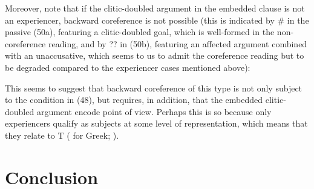 \documentclass[output=paper]{langsci/langscibook}
\begin{document}
    \z

Moreover, note that if the clitic-doubled argument in the embedded clause is not an experiencer, backward coreference is not possible (this is indicated by \# in the passive (50a), featuring a clitic-doubled goal, which is well-formed in the non-coreference reading, and by ?? in (50b), featuring an affected argument combined with an unaccusative, which seems to us to admit the coreference reading but to be degraded compared to the experiencer cases mentioned above):

\ea%
    \label{ex:alexiadou:57}
    \z
\z    

This seems to suggest that backward coreference of this type is not only subject to the condition in (48), but requires, in addition, that the embedded clitic-doubled argument encode point of view. Perhaps this is so because only experiencers qualify as subjects at some level of representation, which means that they relate to T (\citealt{Anagnostopoulou1999} for Greek; \citealt{Landau2010Locative}). 

\section{Conclusion}%
\end{document}

